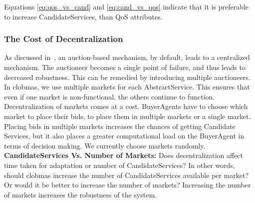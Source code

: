\documentclass[10pt,journal,compsoc]{IEEEtran}
\begin{document}
Equations \ref{eq:qos_vs_cand} and \ref{eq:cand_vs_qos} indicate that it is preferable to increase CandidateServices, than QoS attributes. 


\subsubsection{The Cost of Decentralization}
As discussed in~\cite{Eymann2003Decentralized}, an auction-based mechanism, by default, leads to a centralized mechanism. The auctioneer becomes a single point of failure, and thus leads to decreased robustness. This can be remedied by introducing multiple auctioneers. In clobmas, we use multiple markets for each AbstractService. This ensures that even if one market is non-functional, the others continue to function. Decentralization of markets comes at a cost. BuyerAgents have to choose which market to place their bids, to place them in multiple markets or a single market. Placing bids in multiple markets increases the chances of getting Candidate Services, but it also places a greater computational load on the BuyerAgent in terms of decision making. We currently choose markets randomly.\\
\textbf{CandidateServices Vs. Number of Markets:} Does decentralization affect time taken for adaptation or number of CandidateServices? In other words, should clobmas increase the number of CandidateServices available per market? Or would it be better to increase the number of markets? Increasing the number of markets increases the robustness of the system. 
\end{document}
